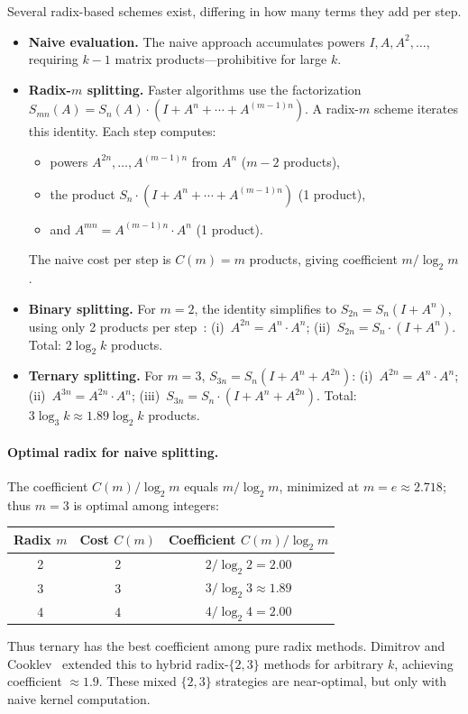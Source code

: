 \documentclass[
  journal=largetwo,
  manuscript=article,
  manuscriptlabel={Research Preprint},
  logo=false,
  simfonts=false,
  year=2026,
  volume=1,
]{cup-journal}
\theoremstyle{definition}
\theoremstyle{remark}
\begin{document}
Several radix-based schemes exist, differing in how many terms they
add per step.
\begin{itemize}
  \item \textbf{Naive evaluation.}
    The naive approach accumulates powers $I, A, A^2, \ldots$, requiring
    $k-1$ matrix products---prohibitive for large $k$.
  \item \textbf{Radix-$m$ splitting.}
    Faster algorithms use the factorization $S_{mn}(A) = S_n(A) \cdot
    (I + A^n + \cdots + A^{(m-1)n})$.
    A radix-$m$ scheme iterates this identity. Each step computes:
    \begin{itemize}
      \item powers $A^{2n}, \ldots, A^{(m-1)n}$ from $A^n$ ($m-2$ products),
      \item the product $S_n \cdot (I + A^n + \cdots + A^{(m-1)n})$
        (1 product),
      \item and $A^{mn} = A^{(m-1)n} \cdot A^n$ (1 product).
    \end{itemize}
    The naive cost per step is $C(m) = m$ products, giving coefficient
    $m/\log_2 m$.
  \item \textbf{Binary splitting.}
    For $m = 2$, the identity simplifies to $S_{2n} = S_n(I + A^n)$, using
    only 2 products per step~\cite{westreich1989,lei1992}:
    (i)~$A^{2n} = A^n \cdot A^n$;
    (ii)~$S_{2n} = S_n \cdot (I + A^n)$.
    Total: $2\log_2 k$ products.
  \item \textbf{Ternary splitting.}
    For $m = 3$, $S_{3n} = S_n(I + A^n + A^{2n})$:
    (i)~$A^{2n} = A^n \cdot A^n$;
    (ii)~$A^{3n} = A^{2n} \cdot A^n$;
    (iii)~$S_{3n} = S_n \cdot (I + A^n + A^{2n})$.
    Total: $3\log_3 k \approx 1.89\log_2 k$ products.
\end{itemize}

\paragraph{Optimal radix for naive splitting.}
The coefficient $C(m)/\log_2 m$ equals $m/\log_2 m$, minimized
at $m = e \approx 2.718$; thus $m = 3$ is optimal among integers:
\begin{center}
\begin{tabular}{@{}ccc@{}}
  \toprule
  Radix $m$ & Cost $C(m)$ & Coefficient $C(m)/\log_2 m$ \\
  \midrule
  2 & 2 & $2/\log_2 2 = 2.00$ \\
  3 & 3 & $3/\log_2 3 \approx 1.89$ \\
  4 & 4 & $4/\log_2 4 = 2.00$ \\
  \bottomrule
\end{tabular}
\end{center}
Thus ternary has the best coefficient among pure radix methods.
Dimitrov and Cooklev~\cite{dimitrov1995} extended this to hybrid
radix-$\{2,3\}$ methods for arbitrary $k$, achieving coefficient
$\approx 1.9$.
These mixed $\{2,3\}$ strategies are near-optimal, but only with
naive kernel computation.
\end{document}
